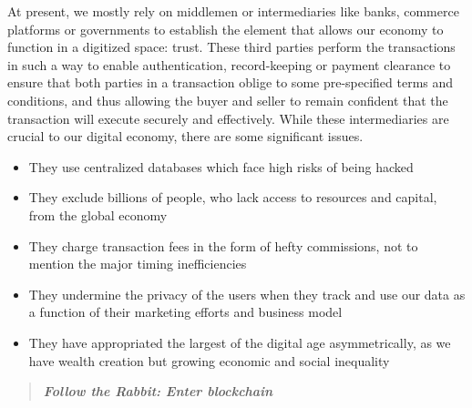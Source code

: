 At present, we mostly rely on middlemen or intermediaries like banks, commerce platforms or governments to establish the element that allows our economy to function in a digitized space: trust. These third parties perform the transactions in such a way to enable authentication, record-keeping or payment clearance to ensure that both parties in a transaction oblige to some pre-specified terms and conditions, and thus allowing the buyer and seller to remain confident that the transaction will execute securely and effectively.
While these intermediaries are crucial to our digital economy, there are some significant issues.

\begin{itemize}
    \setlength\itemsep{0em}

    \item They use centralized databases which face high risks of being hacked
    \item They exclude billions of people, who lack access to resources and capital, from the global economy
    \item They charge transaction fees in the form of hefty commissions, not to mention the major timing inefficiencies
    \item They undermine the privacy of the users when they track and use our data as a function of their marketing efforts and business model
    \item They have appropriated the largest of the digital age asymmetrically, as we have wealth creation but growing economic and social inequality
\end{itemize}

\begin{quote}
    \textbf{\emph{Follow the Rabbit: Enter blockchain}}
\end{quote}
